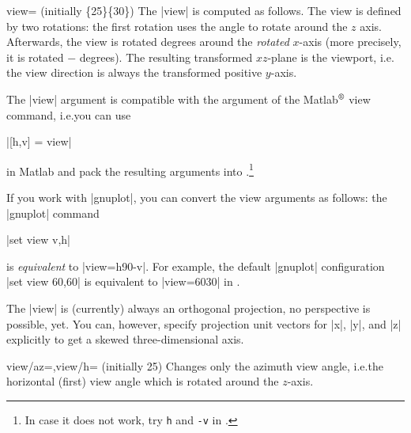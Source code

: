 {\begin{pgfplotskey}{view= (initially \{25\}\{30\})}
    The |view| is computed as follows. The view is defined by two rotations:
    the first rotation uses the  angle to rotate around the $z$
    axis. Afterwards, the view is rotated  degrees around the
    \emph{rotated} $x$-axis (more precisely, it is rotated $-$
    degrees). The resulting transformed $xz$-plane is the viewport, i.e.\@
    the view direction is always the transformed positive $y$-axis.

    The |view| argument is compatible with the argument of the
    Matlab$^\text{\textregistered}$ view command, i.e.\@ you can use

    |[h,v] = view|

    \noindent in Matlab and pack the resulting arguments into
    \PGFPlots.\footnote{In case it does not work, try \texttt{h} and \texttt{-v}
    in \PGFPlots{}.}

    If you work with |gnuplot|, you can convert the view arguments as follows:
    the |gnuplot| command

    |set view v,h|

    \noindent is \emph{equivalent} to |view={h}{90-v}|. For example, the
    default |gnuplot| configuration |set view 60,60| is equivalent to
    |view={60}{30}| in \PGFPlots{}.

    The |view| is (currently) always an orthogonal projection, no perspective
    is possible, yet. You can, however, specify projection unit vectors for
    |x|, |y|, and |z| explicitly to get a skewed three-dimensional axis.
\end{pgfplotskey}

\begin{pgfplotskeylist}{view/az=,view/h= (initially 25)}
    Changes only the azimuth view angle, i.e.\@ the horizontal (first) view
    angle which is rotated around the $z$-axis.
\pgfplotsexpensiveexample
\begin{codeexample}[]
\end{codeexample}

\pgfplotsexpensiveexample
\begin{codeexample}[]
\end{codeexample}


\end{pgfplotskeylist}}
